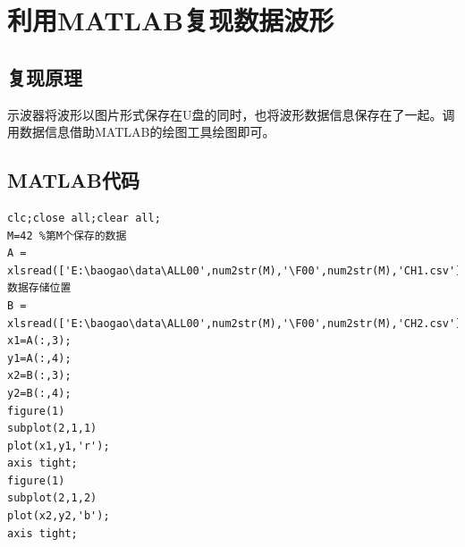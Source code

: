 \documentclass[12pt]{article}
\begin{document}
\section{利用MATLAB复现数据波形}
\setcounter{section}{4}
\setcounter{equation}{0}
\setcounter{table}{0}
\setcounter{figure}{0}
\subsection{复现原理}
示波器将波形以图片形式保存在U盘的同时，也将波形数据信息保存在了一起。调用数据信息借助MATLAB的绘图工具绘图即可。
\subsection{MATLAB代码}
\begin{lstlisting}
clc;close all;clear all;
M=42 %第M个保存的数据
A = xlsread(['E:\baogao\data\ALL00',num2str(M),'\F00',num2str(M),'CH1.csv']);%数据存储位置
B = xlsread(['E:\baogao\data\ALL00',num2str(M),'\F00',num2str(M),'CH2.csv']);
x1=A(:,3);
y1=A(:,4);
x2=B(:,3);
y2=B(:,4);
figure(1)
subplot(2,1,1)
plot(x1,y1,'r');
axis tight;
figure(1)
subplot(2,1,2)
plot(x2,y2,'b');
axis tight;
\end{lstlisting}
\end{document}
